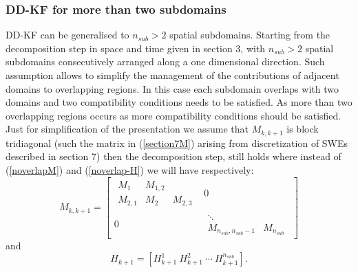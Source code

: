 \documentclass[smallcondensed]{svjour3}
\begin{document}
\subsubsection{DD-KF for more than two subdomains}
 DD-KF  can be generalised to $n_{sub}>2$ spatial subdomains. Starting from the decomposition step in space and time given in section 3,  with $n_{sub}>2$ spatial subdomains consecutively arranged along a one dimensional direction. Such assumption allows to simplify the  management of the contributions of adjacent domains to  overlapping regions. In this case each subdomain overlaps with two domains and two compatibility conditions needs to be satisfied. As more than two overlapping regions occurs  as more compatibility conditions should  be satisfied. Just for simplification of the presentation we assume that   $M_{k,k+1}$ is block tridiagonal (such the matrix in (\ref{section7M}) arising from discretization of  SWEs  described in section 7) then  the decomposition step,   still holds  where instead of (\ref{noverlapM}) and (\ref{noverlap-H}) we will have respectively:
\begin{equation}\label{M_tridiag}
    M_{k,k+1}= \left[\begin{array}{ccc} \begin{array}{ccc} M_1 & M_{1,2} &  \\ M_{2,1}& M_2 &M_{2,3} \end{array} & 0 \\  0 &  \begin{array}{cc} \ddots &  \\ M_{n_{sub},n_{sub}-1}& M_{n_{sub}} \end{array} \end{array}\right]
\end{equation}
and 
\begin{equation}
    H_{k+1}=\left[H_{k+1}^{1} \ H_{k+1}^{2} \ \cdots \ H_{k+1}^{n_{sub}} \right].
\end{equation}

\end{document}
